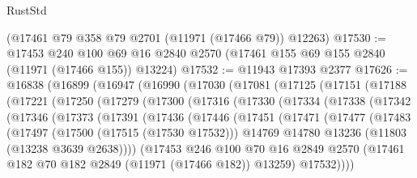 \begin{lexlean}{RustStd}
\begin{coremodule}
    (@17461 @79 @358 @79 @2701 (@11971 (@17466 @79)) @12263)
@17530 := @17453
    @240
    @100
    @69
    @16
    @2840
    @2570
    (@17461 @155 @69 @155 @2840 (@11971 (@17466 @155)) @13224)
@17532 := @11943 @17393 @2377
@17626 := @16838
    (@16899
      (@16947
        (@16990
          (@17030
            (@17081
              (@17125
                (@17151
                  (@17188
                    (@17221
                      (@17250
                        (@17279
                          (@17300
                            (@17316
                              (@17330
                                (@17334
                                  (@17338
                                    (@17342
                                      (@17346
                                        (@17373
                                          (@17391
                                            (@17436
                                              (@17446
                                                (@17451
                                                  (@17471
                                                    (@17477
                                                      (@17483
                                                        (@17497
                                                          (@17500 (@17515 (@17530 @17532)))
                                                          @14769
                                                          @14780
                                                          @13236
                                                          (@11803 (@13238 @3639 @2638))))
                                                      (@17453
                                                        @246
                                                        @100
                                                        @70
                                                        @16
                                                        @2849
                                                        @2570
                                                        (@17461
                                                          @182
                                                          @70
                                                          @182
                                                          @2849
                                                          (@11971 (@17466 @182))
                                                          @13259)
                                                        @17532))))

\end{coremodule}
\end{lexlean}

